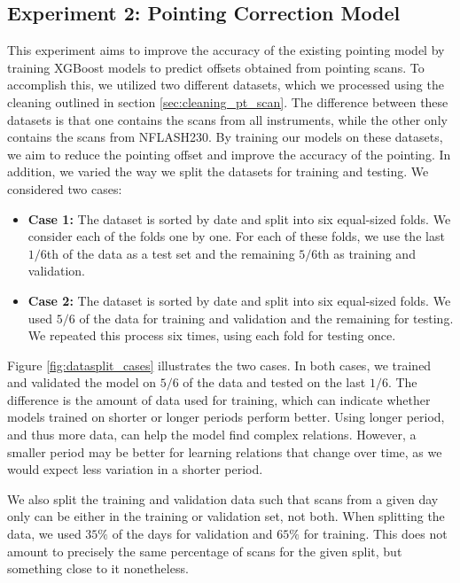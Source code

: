 \subsection{Experiment 2: Pointing Correction Model}
This experiment aims to improve the accuracy of the existing pointing model by training XGBoost models to predict offsets obtained from pointing scans.
To accomplish this, we utilized two different datasets, which we processed using the cleaning outlined in section \ref{sec:cleaning_pt_scan}.
The difference between these datasets is that one contains the scans from all instruments, while the other only contains the scans from NFLASH230.
By training our models on these datasets, we aim to reduce the pointing offset and improve the accuracy of the pointing.
In addition, we varied the way we split the datasets for training and testing.
We considered two cases:

\begin{itemize}
    \item \textbf{Case 1:} The dataset is sorted by date and split into six equal-sized folds.
    We consider each of the folds one by one.
    For each of these folds, we use the last $1/6$th of the data as a test set and the remaining $5/6$th as training and validation.
    \item \textbf{Case 2:} The dataset is sorted by date and split into six equal-sized folds.
    We used $5/6$ of the data for training and validation and the remaining for testing.
    We repeated this process six times, using each fold for testing once.
\end{itemize}

Figure \ref{fig:datasplit_cases} illustrates the two cases.
In both cases, we trained and validated the model on $5/6$ of the data and tested on the last $1/6$.
The difference is the amount of data used for training, which can indicate whether models trained on shorter or longer periods perform better.
Using longer period, and thus more data, can help the model find complex relations.
However, a smaller period may be better for learning relations that change over time, as we would expect less variation in a shorter period.

We also split the training and validation data such that scans from a given day only can be either in the training or validation set, not both.
When splitting the data, we used $35\%$ of the days for validation and $65\%$ for training.
This does not amount to precisely the same percentage of scans for the given split, but something close to it nonetheless.


